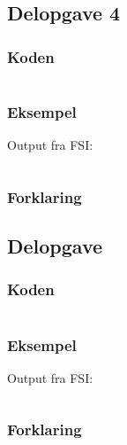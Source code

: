 \subsection{Delopgave 4}\label{ass:1-4}
\subsubsection{Koden}
\begin{lstlisting}[language=fsharp]

\end{lstlisting}

\subsubsection{Eksempel}
Output fra FSI:
\begin{lstlisting}

\end{lstlisting}

\subsubsection{Forklaring}



\subsection{Delopgave }\label{ass:1-}
\subsubsection{Koden}
\begin{lstlisting}[language=fsharp]

\end{lstlisting}

\subsubsection{Eksempel}
Output fra FSI:
\begin{lstlisting}

\end{lstlisting}

\subsubsection{Forklaring}


